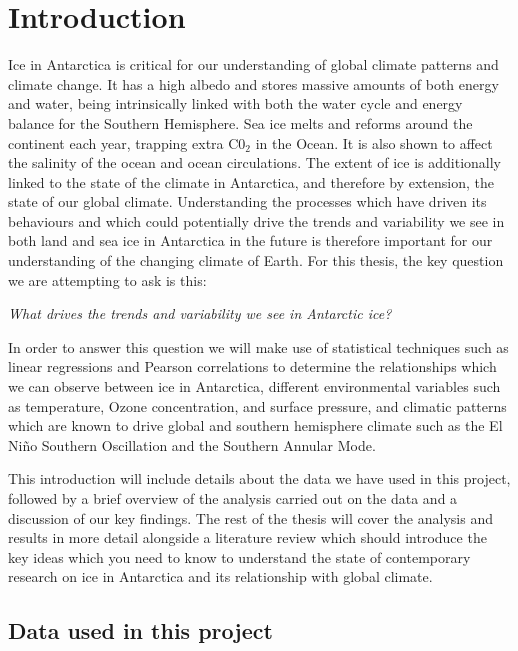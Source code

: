 \documentclass[../main.tex]{subfiles}
\begin{document}
\chapter{Introduction}

Ice in Antarctica is critical for our understanding of global climate patterns and climate change. It has a high albedo and stores massive amounts of both energy and water, being intrinsically linked with both the water cycle and energy balance for the Southern Hemisphere. Sea ice melts and reforms around the continent each year, trapping extra C0$_2$ in the Ocean. It is also shown to affect the salinity of the ocean and ocean circulations. 
The extent of ice is additionally linked to the state of the climate in Antarctica, and therefore by extension, the state of our global climate. Understanding the processes which have driven its behaviours and which could potentially drive the trends and variability we see in both land and sea ice in Antarctica in the future is therefore important for our understanding of the changing climate of Earth.
For this thesis, the key question we are attempting to ask is this:
\medskip 

\begin{tcolorbox}[colback=white!98!black,colframe=grey!60!blue]
\centering
	\textit{What drives the trends and variability we see in Antarctic ice?}
\end{tcolorbox}

In order to answer this question we will make use of statistical techniques such as linear regressions and Pearson correlations to determine the relationships which we can observe between ice in Antarctica, different environmental variables such as temperature, Ozone concentration, and surface pressure, and climatic patterns which are known to drive global and southern hemisphere climate such as the El Ni\~no Southern Oscillation and the Southern Annular Mode.

This introduction will include details about the data we have used in this project, followed by a brief overview of the analysis carried out on the data and a discussion of our key findings. The rest of the thesis will cover the analysis and results in more detail alongside a literature review which should introduce the key ideas which you need to know to understand the state of contemporary research on ice in Antarctica and its relationship with global climate.


\section{Data used in this project}
\end{document}
